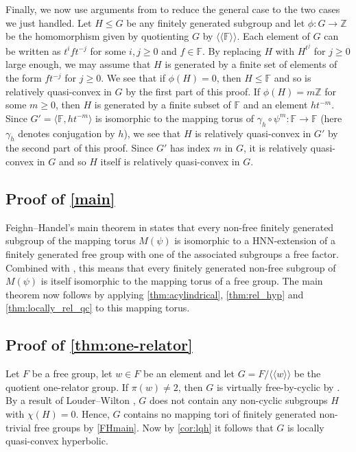 \documentclass[11pt, a4paper]{amsart}
\theoremstyle{definition}
\newcommand{\F}{\mathbb{F}}
\newcommand{\Z}{\mathbb{Z}}
\newcommand{\normal}[1]{\langle\!\langle #1 \rangle\!\rangle}
\newcounter{cases}
\begin{document}
Finally, we now use arguments from \cite{FH99} to reduce the general case to the two cases we just handled. Let $H\leqslant G$ be any finitely generated subgroup and let $\phi\colon G\to \Z$ be the homomorphism given by quotienting $G$ by $\normal{\F}$. Each element of $G$ can be written as $t^i f t^{-j}$ for some $i, j\geqslant 0$ and $f\in \F$. By replacing $H$ with $H^{t^j}$ for $j\geqslant 0$ large enough, we may assume that $H$ is generated by a finite set of elements of the form $ft^{-j}$ for $j\geqslant 0$. We see that if $\phi(H) = 0$, then $H\leqslant \F$ and so is relatively quasi-convex in $G$ by the first part of this proof. If $\phi(H) = m\Z$ for some $m\geqslant 0$, then $H$ is generated by a finite subset of $\F$ and an element $ht^{-m}$. Since $G' = \langle \F, ht^{-m}\rangle$ is isomorphic to the mapping torus of $\gamma_h\circ\psi^m\colon\F\to\F$ (here $\gamma_h$ denotes conjugation by $h$), we see that $H$ is relatively quasi-convex in $G'$ by the second part of this proof. Since $G'$ has index $m$ in $G$, it is relatively quasi-convex in $G$ and so $H$ itself is relatively quasi-convex in $G$.


\subsection{Proof of \cref{main}}

Feighn--Handel's main theorem in \cite{FH99} states that every non-free finitely generated subgroup of the mapping torus $M(\psi)$ is isomorphic to a HNN-extension of a finitely generated free group with one of the associated subgroups a free factor. Combined with \cite[Proposition 2.1]{FH99}, this means that every finitely generated non-free subgroup of $M(\psi)$ is itself isomorphic to the mapping torus of a free group. The main theorem now follows by applying \cref{thm:acylindrical}, \cref{thm:rel_hyp} and \cref{thm:locally_rel_qc} to this mapping torus.


\subsection{Proof of \cref{thm:one-relator}}

Let $F$ be a free group, let $w\in F$ be an element and let $G = F/\normal{w}$ be the quotient one-relator group. If $\pi(w)\neq 2$, then $G$ is virtually free-by-cyclic by \cite{KL24b}. By a result of Louder--Wilton \cite[Lemma 6.10]{LW22}, $G$ does not contain any non-cyclic subgroups $H$ with $\chi(H) = 0$. Hence, $G$ contains no mapping tori of finitely generated non-trivial free groups by \cref{FHmain}. Now by \cref{cor:lqh} it follows that $G$ is locally quasi-convex hyperbolic.
\end{document}
